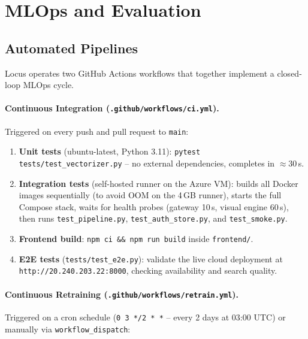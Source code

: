 \documentclass[12pt]{article}
\begin{document}
\section{MLOps and Evaluation}

\subsection{Automated Pipelines}

Locus operates two GitHub Actions workflows that together implement a closed-loop MLOps cycle.

\paragraph{Continuous Integration (\texttt{.github/workflows/ci.yml}).}
Triggered on every push and pull request to \texttt{main}:

\begin{enumerate}[leftmargin=*]
  \item \textbf{Unit tests} (ubuntu-latest, Python 3.11): \texttt{pytest tests/test\_vectorizer.py} -- no external dependencies, completes in $\approx$30\,s.
  \item \textbf{Integration tests} (self-hosted runner on the Azure VM): builds all Docker images sequentially (to avoid OOM on the 4\,GB runner), starts the full Compose stack, waits for health probes (gateway 10\,s, visual engine 60\,s), then runs \texttt{test\_pipeline.py}, \texttt{test\_auth\_store.py}, and \texttt{test\_smoke.py}.
  \item \textbf{Frontend build}: \texttt{npm ci \&\& npm run build} inside \texttt{frontend/}.
  \item \textbf{E2E tests} (\texttt{tests/test\_e2e.py}): validate the live cloud deployment at \texttt{http://20.240.203.22:8000}, checking availability and search quality.
\end{enumerate}

\paragraph{Continuous Retraining (\texttt{.github/workflows/retrain.yml}).}
Triggered on a cron schedule (\texttt{0 3 */2 * *} -- every 2 days at 03:00 UTC) or manually via \texttt{workflow\_dispatch}:
\end{document}
